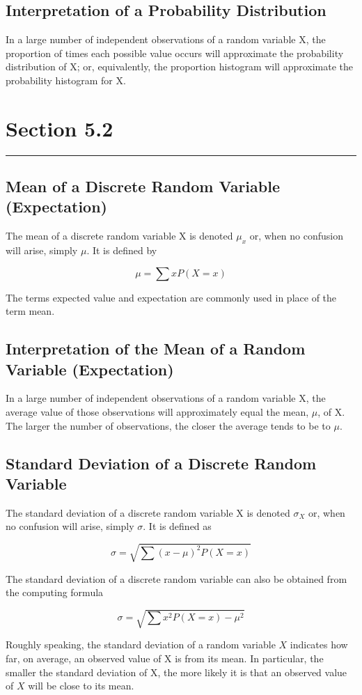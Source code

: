 \documentclass[12pt]{article}
\begin{document}
        \subsection*{Interpretation of a Probability Distribution}
            In a large number of independent observations of a random variable X, the proportion of times
            each possible value occurs will approximate the probability distribution of X; or, equivalently,
            the proportion histogram will approximate the probability histogram for X.
    \section*{Section 5.2}
    \noindent\rule{\textwidth}{0.4pt}
        \subsection*{Mean of a Discrete Random Variable (Expectation)}
            The mean of a discrete random variable X is denoted $\mu_x$ or, when no confusion will arise,
            simply $\mu$. It is defined by
            \begin{center}
                \[
                    \mu = \sum xP(X = x)    
                \]                  
            \end{center}
            The terms expected value and expectation are commonly used in place of the term mean.
        \subsection*{Interpretation of the Mean of a Random Variable (Expectation)}
            In a large number of independent observations of a random variable X, the average value of those
            observations will approximately equal the mean, $\mu$, of X. The larger the number of observations,
            the closer the average tends to be to $\mu$.
        \subsection*{Standard Deviation of a Discrete Random Variable}
            The standard deviation of a discrete random variable X is denoted $\sigma_X$ or, when no confusion
            will arise, simply $\sigma$. It is defined as
            \begin{center}
                \[
                    \sigma = \sqrt{\sum (x - \mu)^2 P(X = x)}    
                \]
            \end{center}
            The standard deviation of a discrete random variable can also be obtained from the computing 
            formula
            \begin{center}
                \[
                    \sigma = \sqrt{\sum x^2 P(X = x) - \mu^2}    
                \]
            \end{center}
            Roughly speaking, the standard deviation of a random variable $X$ indicates how far, on average,
            an observed value of X is from its mean. In particular, the smaller the standard deviation of X,
            the more likely it is that an observed value of $X$ will be close to its mean.
\end{document}

